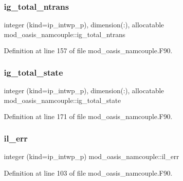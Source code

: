 \subsubsection{\texorpdfstring{ig\+\_\+total\+\_\+ntrans}{ig\_total\_ntrans}}
{\footnotesize\ttfamily integer (kind=ip\+\_\+intwp\+\_\+p), dimension(\+:), allocatable mod\+\_\+oasis\+\_\+namcouple\+::ig\+\_\+total\+\_\+ntrans\hspace{0.3cm}{\ttfamily [private]}}



Definition at line 157 of file mod\+\_\+oasis\+\_\+namcouple.\+F90.

\mbox{\label{namespacemod__oasis__namcouple_a7c783457d0e759e3af98b92146fa4ec3}} 
\subsubsection{\texorpdfstring{ig\+\_\+total\+\_\+state}{ig\_total\_state}}
{\footnotesize\ttfamily integer (kind=ip\+\_\+intwp\+\_\+p), dimension(\+:), allocatable mod\+\_\+oasis\+\_\+namcouple\+::ig\+\_\+total\+\_\+state\hspace{0.3cm}{\ttfamily [private]}}



Definition at line 171 of file mod\+\_\+oasis\+\_\+namcouple.\+F90.

\mbox{\label{namespacemod__oasis__namcouple_a18b7a14f095f3cb6ace40afc06e2a5b9}} 
\subsubsection{\texorpdfstring{il\+\_\+err}{il\_err}}
{\footnotesize\ttfamily integer (kind=ip\+\_\+intwp\+\_\+p) mod\+\_\+oasis\+\_\+namcouple\+::il\+\_\+err\hspace{0.3cm}{\ttfamily [private]}}



Definition at line 103 of file mod\+\_\+oasis\+\_\+namcouple.\+F90.


